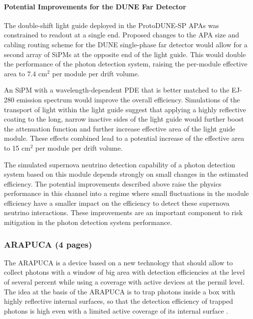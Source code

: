 \paragraph*{Potential Improvements for the DUNE Far Detector}

The double-shift light guide deployed in the ProtoDUNE-SP APAs was constrained 
to readout at a single end. Proposed changes to the APA size and cabling routing 
scheme for the DUNE single-phase far detector would allow for a second array of 
SiPMs at the opposite end of the light guide. This would double the performance of
 the photon detection system, raising the per-module effective area to 7.4 cm$^{2}$ 
per module per drift volume.

An SiPM with a wavelength-dependent PDE that is better matched to the EJ-280 emission 
spectrum would improve the overall efficiency. Simulations of the transport of light 
within the light guide suggest that applying a highly reflective coating to the long, 
narrow inactive sides of the light guide would further boost the attenuation function
 and further increase effective area of the light guide module. These effects combined 
lead to a potential increase of the effective area to 15 cm$^{2}$ per module per drift volume.

The simulated supernova neutrino detection capability of a photon detection system 
based on this module depends strongly on small changes in the estimated efficiency.
 The potential improvements described above raise the physics performance in this 
channel into a regime where small fluctuations in the module efficiency have a 
smaller impact on the efficiency to detect these supernova neutrino interactions. 
These improvements are an important component to risk mitigation in the photon 
detection system performance.


\subsubsection{ARAPUCA (4 pages)}
\label{ssec:fdsp-pd-pc-arapuca}


The ARAPUCA is a device based on a new technology that should allow to collect photons with a window of big area with detection efficiencies at the level of several percent while using a coverage with active devices at the permil level.
The idea at the basis of the ARAPUCA is to trap photons inside a box with highly reflective internal surfaces, so that the detection efficiency of trapped photons is high even with a 
limited active coverage of its internal surface \cite{arapuca_jinst}.\\ 

